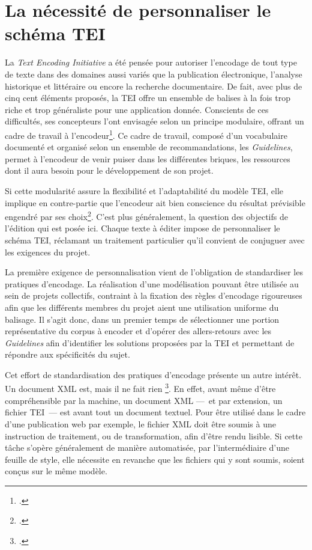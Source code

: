 \documentclass[12pt,a4paper]{book} %
\begin{document}

\section{La nécessité de personnaliser le schéma TEI}

La \textit{Text Encoding Initiative} a été pensée pour autoriser l'encodage de tout type de texte dans des domaines aussi variés que la publication électronique, l'analyse historique et littéraire ou encore la recherche documentaire. De fait, avec plus de cinq cent éléments proposés, la TEI offre un ensemble de balises à la fois trop riche et trop généraliste pour une application donnée. Conscients de ces difficultés, ses concepteurs l'ont envisagée selon un principe modulaire, offrant un cadre de travail à l'encodeur\footcite{ide_application_1996}. Ce cadre de travail, composé d'un vocabulaire documenté et organisé selon un ensemble de recommandations, les \textit{Guidelines}, permet   à l'encodeur de venir puiser dans les différentes briques, les ressources dont il aura besoin pour le développement de son projet.

Si cette modularité assure la flexibilité et l'adaptabilité du modèle TEI, elle implique en contre-partie que l'encodeur ait bien conscience du résultat prévisible engendré par ses  choix\footcite{chateau_ledition_2013}. C'est plus généralement, la question des objectifs de l'édition qui est posée ici. Chaque texte à éditer  impose de personnaliser le schéma TEI, réclamant un traitement particulier qu'il convient de conjuguer avec les exigences du projet.

La première exigence de personnalisation vient de l'obligation de standardiser les pratiques d'encodage. La réalisation d'une modélisation pouvant être utilisée au sein de projets collectifs, contraint à la  fixation des règles d'encodage rigoureuses afin que les différents membres du projet aient une utilisation uniforme du balisage. Il s'agit donc, dans un premier temps de sélectionner une portion représentative du corpus à encoder et d'opérer des allers-retours avec les \textit{Guidelines} afin d'identifier les solutions proposées par la TEI et permettant de répondre aux spécificités du sujet.

Cet effort de standardisation des pratiques d'encodage présente un autre intérêt. \og Un document XML est, mais il ne fait rien \fg{}\footcite[p. 5]{harold_xml_2005}. En effet, avant même d'être compréhensible par la machine, un document XML ---~et par extension, un fichier TEI~--- est avant tout un document textuel. Pour être utilisé dans le cadre d'une publication web par exemple, le fichier XML doit être soumis à une instruction de traitement, ou de transformation, afin d'être rendu lisible. Si cette tâche s'opère généralement de manière automatisée, par l'intermédiaire d'une feuille de style, elle nécessite en revanche que les fichiers qui y sont soumis, soient conçus sur le même modèle. 
\end{document}
